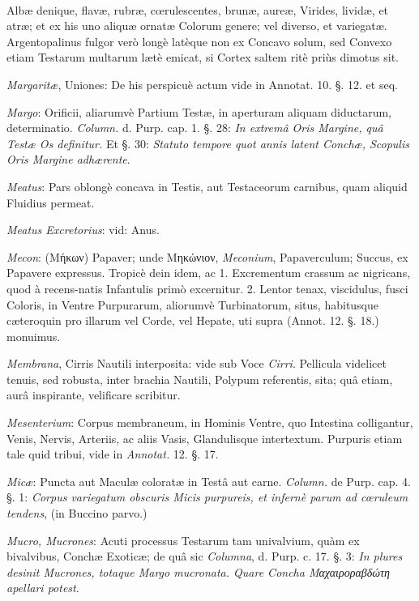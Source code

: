 \documentclass[a4paper, 11pt, oneside, polutonikogreek, german]{article}
\begin{document}
\paragraph{}
Albæ denique, flavæ, rubræ, cœrulescentes, brunæ, aureæ, Virides, lividæ, et atræ; et ex his uno aliquæ ornatæ Colorum genere; vel diverso, et variegatæ. Argentopalinus fulgor verò longè latèque non ex Concavo solum, sed Convexo etiam Testarum multarum lætè emicat, si Cortex saltem ritè priùs dimotus sit.

\emph{Margaritæ}, Uniones: De his perspicuè actum vide in Annotat. 10. §. 12. et seq.

\emph{Margo}: Orificii, aliarumvè Partium Testæ, in aperturam aliquam diductarum, determinatio. \emph{Column.} d. Purp. cap. 1. §. 28: \emph{In extremâ Oris Margine, quâ Testæ Os definitur.} Et §. 30: \emph{Statuto tempore quot annis latent Conchæ, Scopulis Oris Margine adhærente}.

\emph{Meatus}: Pars oblongè concava in Testis, aut Testaceorum carnibus, quam aliquid Fluidius permeat.

\emph{Meatus Excretorius}: vid: Anus.

\emph{Mecon}: (Μήκων) Papaver; unde Μηκώνιον, \emph{Meconium}, Papaverculum; Succus, ex Papavere expressus. Tropicè dein idem, ac 1. Excrementum crassum ac nigricans, quod à recens-natis Infantulis primò excernitur. 2. Lentor tenax, viscidulus, fusci Coloris, in Ventre Purpurarum, aliorumvè Turbinatorum, situs, habitusque cæteroquin pro illarum vel Corde, vel Hepate, uti supra (Annot. 12. §. 18.) monuimus.

\emph{Membrana}, Cirris Nautili interposita: vide sub Voce \emph{Cirri}. Pellicula videlicet tenuis, sed robusta, inter brachia Nautili, Polypum referentis, sita; quâ etiam, aurâ inspirante, velificare scribitur.

\emph{Mesenterium}: Corpus membraneum, in Hominis Ventre, quo Intestina colligantur, Venis, Nervis, Arteriis, ac aliis Vasis, Glandulisque intertextum. Purpuris etiam tale quid tribui, vide in \emph{Annotat.} 12. §. 17.

\emph{Micæ}: Puncta aut Maculæ coloratæ in Testâ aut carne. \emph{Column.} de Purp. cap. 4. §. 1: \emph{Corpus variegatum obscuris Micis purpureis, et infernè parum ad cœruleum tendens}, (in Buccino parvo.)

\emph{Mucro, Mucrones}: Acuti processus Testarum tam univalvium, quàm ex bivalvibus, Conchæ Exoticæ; de quâ sic \emph{Columna}, d. Purp. c. 17. §. 3: \emph{In plures desinit Mucrones, totaque Margo mucronata. Quare Concha Μαχαιροραβδώτη apellari potest}.
\end{document}
